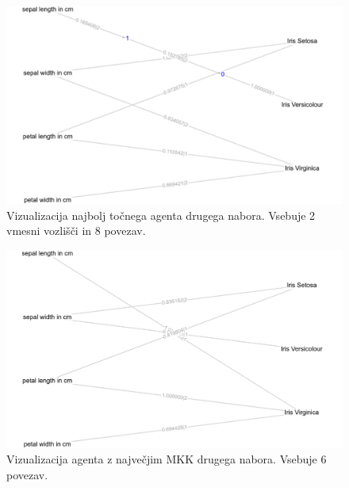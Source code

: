 \begin{figure}[H]
    \begin{center}
        \includegraphics[width=13cm]{iris/2/acc_g}
    \end{center}
    \caption{Vizualizacija najbolj točnega agenta drugega nabora. Vsebuje 2 vmesni vozlišči in 8 povezav.}
    \label{fig:iris_acc_2_g}
\end{figure}

\begin{figure}[H]
    \begin{center}
        \includegraphics[width=13cm]{iris/2/mcc_g}
    \end{center}
    \caption{Vizualizacija agenta z največjim MKK drugega nabora. Vsebuje 6 povezav.}
    \label{fig:iris_mcc_2_g}
\end{figure}

